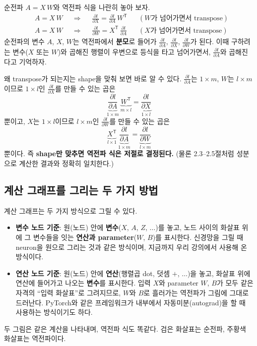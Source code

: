 \documentclass[11pt,a4paper]{article}
\newcommand{\T}{^{\mathsf T}}
\newcommand{\pd}[2]{\frac{\partial #1}{\partial #2}}
\begin{document}
\begin{thinkbox}
순전파 $A=X\,W$와 역전파 식을 나란히 놓아 보자.
\[
\begin{aligned}
&A=X\,W
&&\Longrightarrow&&
\pd{l}{X}=\pd{l}{A}\,W\T
&&(\text{$W$가 넘어가면서 transpose})\\[4pt]
&A=X\,W
&&\Longrightarrow&&
\pd{l}{W}=X\T\,\pd{l}{A}
&&(\text{$X$가 넘어가면서 transpose})
\end{aligned}
\]
순전파의 변수 $A$, $X$, $W$는 역전파에서 \textbf{분모}로 들어가
$\pd{l}{A}$, $\pd{l}{X}$, $\pd{l}{W}$가 된다.
이때 구하려는 변수($X$ 또는 $W$)와 곱해진 행렬이 우변으로 등식을 타고 넘어가면서,
$\pd{l}{A}$와 곱해진다고 기억하자.

왜 transpose가 되는지는 shape을 맞춰 보면 바로 알 수 있다.
$\pd{l}{A}$는 $1\times m$, $W$는 $l\times m$이므로
$1\times l$인 $\pd{l}{X}$를 만들 수 있는 곱은
\[
\underbrace{\pd{l}{A}}_{1\times m}\ \underbrace{W\T}_{m\times l}=\underbrace{\pd{l}{X}}_{1\times l}
\]
뿐이고, $X$는 $1\times l$이므로 $l\times m$인 $\pd{l}{W}$를 만들 수 있는 곱은
\[
\underbrace{X\T}_{l\times1}\ \underbrace{\pd{l}{A}}_{1\times m}=\underbrace{\pd{l}{W}}_{l\times m}
\]
뿐이다. 즉 \textbf{shape만 맞추면 역전파 식은 저절로 결정된다.}
(물론 2.3--2.5절처럼 성분으로 계산한 결과와 정확히 일치한다.)
\end{thinkbox}

\subsection{계산 그래프를 그리는 두 가지 방법}

계산 그래프는 두 가지 방식으로 그릴 수 있다.
\begin{itemize}[leftmargin=1.8em]
\item \textbf{변수 노드 기준}: 원(노드) 안에 \textbf{변수}($X$, $A$, $Z$, $\ldots$)를 놓고,
노드 사이의 화살표 위에 그 변수들을 잇는 \textbf{연산과 parameter}($W$, $B$)를 표시한다.
신경망을 그릴 때 neuron을 원으로 그리는 것과 같은 방식이며,
지금까지 우리 강의에서 사용해 온 방식이다.
\item \textbf{연산 노드 기준}: 원(노드) 안에 \textbf{연산}(행렬곱 dot, 덧셈 $+$, $\ldots$)을 놓고,
화살표 위에 연산에 들어가고 나오는 \textbf{변수}를 표시한다.
입력 $X$와 parameter $W$, $B$가 모두 같은 자격의 ``입력 화살표''로 그려지므로,
$W$와 $B$로 흘러가는 역전파가 그림에 그대로 드러난다.
PyTorch와 같은 프레임워크가 내부에서 자동미분(autograd)을 할 때 사용하는 방식이기도 하다.
\end{itemize}
두 그림은 같은 계산을 나타내며, 역전파 식도 똑같다.
검은 화살표는 순전파, 주황색 화살표는 역전파이다.
\end{document}
